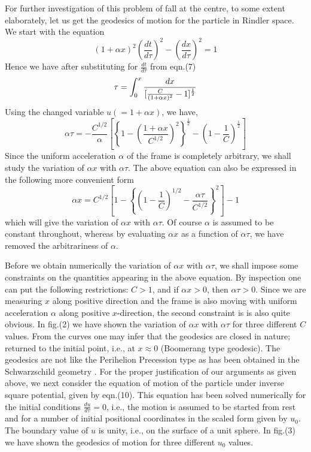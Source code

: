 \documentclass[12pt]{article}
\begin{document}
For further investigation of this problem of fall at the centre, to some extent elaborately, 
let us  get the geodesics of motion for the particle in Rindler space.
We start with the equation
\begin{equation} 
(1+\alpha x)^2\left (\frac{dt}{d\tau}\right )^2-\left (\frac{dx}{d\tau}\right )^2=1 
\end{equation}
Hence we have after substituting for $\frac{dt}{d\tau}$ from eqn.(7)
\begin{equation}
\tau=\large\int_0^x \frac{dx}{[\frac{C}{(1+\alpha x)^2}-1]^\frac{1}{2}} 
\end{equation}
Using the changed variable $u(=1+\alpha x)$, we have,
\begin{equation}
\alpha \tau=-\frac{C^{1/2}}{\alpha}\left[ \left\lbrace 1-\left (\frac{1+\alpha
x}{C^{1/2}}\right )^2 \right\rbrace^\frac{1}{2}-\left(1-\frac{1}{C}\right)^\frac{1}{2}\right]
\end{equation}
Since the uniform acceleration $\alpha$ of the frame is completely arbitrary, we shall study
the variation of $\alpha x$ with $\alpha \tau$. The above equation can also be expressed
in the following more convenient form
\begin{equation}
\alpha x=C^{1/2} \left [1-\left \{\left (1-\frac{1}{C}\right )^{1/2}-\frac{\alpha
\tau}{C^{1/2}}\right \}^2\right ]-1
\end{equation}
which will give the variation of $\alpha x$ with $\alpha \tau$. Of course $\alpha$ is
assumed to be constant throughout, whereas by evaluating $\alpha x$ as a function of $\alpha
\tau$, we have removed the arbitrariness of $\alpha$.

Before we obtain numerically  the variation of $\alpha x$ with $\alpha \tau$, we shall impose 
some constraints on the quantities appearing in the above equation. By inspection one 
can put the following restrictions: $C> 1$, and if $\alpha x> 0$, then $\alpha \tau > 0$. 
Since we are  measuring $x$ along positive direction and the frame is also moving with
uniform acceleration $\alpha $ along positive $x$-direction, the second constraint is
is also quite obvious. In fig.(2) we have shown the variation of $\alpha x$ with $\alpha \tau$ for
three different $C$ values. From the curves one may infer that the geodesics are closed in
nature; returned to the initial point, i.e., at $ x\approx 0$ (Boomerang type geodesic). The geodesics are
not like the Perihelion Precession type as has been obtained in the Schwarzschild geometry \cite{R16,R17}.
For the proper justification of our arguments as given above, we
next consider the equation of motion of the particle under inverse square potential, given 
by eqn.(10). This equation has been solved numerically for the initial conditions
$\frac{du}{d\tau}=0$, i.e., the motion is assumed to be started from rest and for a number of initial
positional coordinates in the scaled form given by $u_0$. 
The boundary value of $u$ is unity, i.e., on the surface of a unit sphere.
In fig.(3) we have shown the geodesics of motion for three different $u_0$ values.
\end{document}
